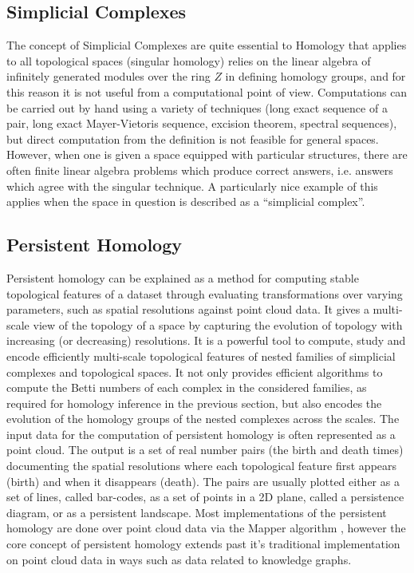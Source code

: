 \subsection{Simplicial Complexes}
The concept of Simplicial Complexes \cite{03.1_2009simplicialHomotopy} \cite{08_1971simplicialComplex} are quite essential to Homology that applies to all topological spaces (singular homology) relies on the linear algebra of infinitely generated modules over the ring $Z$ in defining homology groups, and for this reason it is not useful from a computational point of view. Computations can be carried out by hand using a variety of techniques (long exact sequence of a pair, long exact Mayer-Vietoris sequence, excision theorem, spectral sequences), but direct computation from the definition is not feasible for general spaces.\cite{03.2_2008FindingHomology}
However, when one is given a space equipped with particular structures, there are often finite linear algebra problems which produce correct answers, i.e. answers which agree with the singular technique. A particularly nice example of this applies when the space in question is described as a “simplicial complex”.\cite{08.2_1992simplicialAlgebricTopo} \cite{08.3_2018simplicialComplexes}

\subsection{Persistent Homology}
Persistent homology \cite{03.3_de2007PersistentHomology} \cite{03_1944Homology} \cite{03.3_de2007PersistentHomology} can be explained as a method for computing stable topological features of a dataset through evaluating transformations over varying parameters, such as spatial resolutions against point cloud data. It gives a multi-scale view of the topology of a space by capturing the evolution of topology with increasing (or decreasing) resolutions. It  is a powerful tool to compute, study and encode efficiently multi-scale topological features of nested families of simplicial complexes and topological spaces. It not only provides efficient algorithms to compute the Betti numbers of each complex in the considered families, as required for homology inference in the previous section, but also encodes the evolution of the homology groups of the nested complexes across the scales.\cite{03.7_2018homologicalAlgebra&Data}
The input data for the computation of persistent homology is often represented as a point cloud. The output is a set of real number pairs (the birth and death times) documenting the spatial resolutions where each topological feature first appears (birth) and when it disappears (death). The pairs are usually plotted either as a set of lines, called bar-codes, as a set of points in a 2D plane, called a persistence diagram, or as a persistent landscape. Most implementations of the persistent homology are done over point cloud data via the Mapper algorithm \cite{01.9_2007MapperPBG}, however the core concept of persistent homology extends past it's traditional implementation on point cloud data in ways such as data related to knowledge graphs.\cite{01.1_1stCourse2018algebraicTopo}\cite{03.2_2008FindingHomology}

